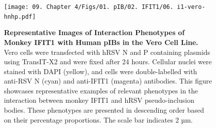 \begin{figure}
    \centering
    \texttt{[image: 09. Chapter 4/Figs/01. pIB/02. IFIT1/06. i1-vero-hnhp.pdf]}
    \caption[Representative Images of Interaction Phenotypes of Monkey IFIT1 with Human pIBs in the Vero Cell Line.]{\textbf{Representative Images of Interaction Phenotypes of Monkey IFIT1 with Human pIBs in the Vero Cell Line.} Vero cells were transfected with hRSV N and P containing plasmids using TransIT-X2 and were fixed after 24 hours. Cellular nuclei were stained with DAPI (yellow), and cells were double-labelled with anti-RSV N (cyan) and anti-IFIT1 (magenta) antibodies. This figure showcases representative examples of relevant phenotypes in the interaction between monkey IFIT1 and hRSV pseudo-inclusion bodies. These phenotypes are presented in descending order based on their percentage proportions. The scale bar indicates 2 µm.}
    \label{fig:Representative Images of Interaction Phenotypes of Monkey IFIT1 with Human pIBs in the VERO Cell Line}
\end{figure}

